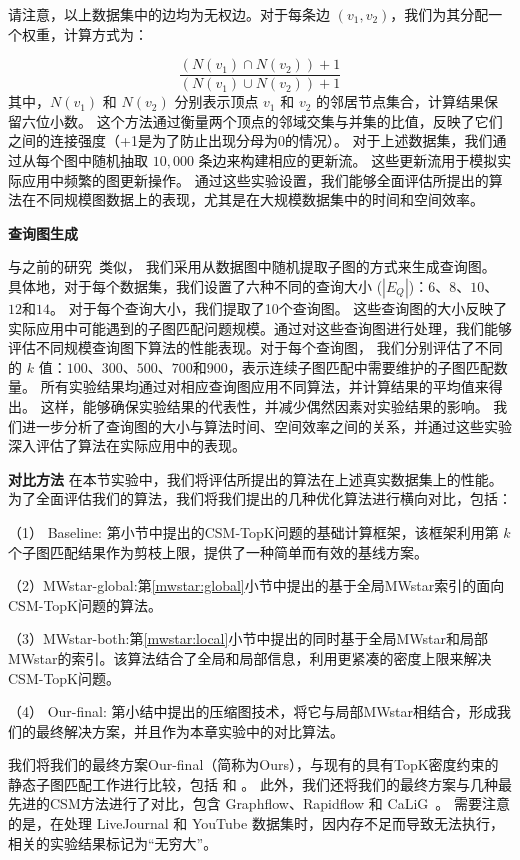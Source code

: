 请注意，以上数据集中的边均为无权边。对于每条边 $(v_1, v_2)$，我们为其分配一个权重，计算方式为：

\[
    \frac{(N(v_1) \cap N(v_2)) + 1}{(N(v_1) \cup N(v_2)) + 1}
\]
其中，$N(v_1)$ 和 $N(v_2)$ 分别表示顶点 $v_1$ 和 $v_2$ 的邻居节点集合，计算结果保留六位小数。
这个方法通过衡量两个顶点的邻域交集与并集的比值，反映了它们之间的连接强度（+1是为了防止出现分母为0的情况）。
对于上述数据集，我们通过从每个图中随机抽取 $10,000$ 条边来构建相应的更新流。
这些更新流用于模拟实际应用中频繁的图更新操作。
通过这些实验设置，我们能够全面评估所提出的算法在不同规模图数据上的表现，尤其是在大规模数据集中的时间和空间效率。


\textbf{查询图生成}
\label{ss-sec:querygen}

与之前的研究~\cite{csm-turboflux-DBLP:conf/sigmod/KimSHLHCSJ18,csm-symbi-DBLP:journals/pvldb/MinPPGIH21,csm-survey:DBLP:journals/pvldb/SunSLH22}类似，
我们采用从数据图中随机提取子图的方式来生成查询图。
具体地，对于每个数据集，我们设置了六种不同的查询大小 ($|E_Q|$)：$6$、$8$、$10$、$12$和$14$。
对于每个查询大小，我们提取了10个查询图。
这些查询图的大小反映了实际应用中可能遇到的子图匹配问题规模。通过对这些查询图进行处理，我们能够评估不同规模查询图下算法的性能表现。对于每个查询图，
我们分别评估了不同的 $k$ 值：$100$、$300$、$500$、$700$和$900$，表示连续子图匹配中需要维护的子图匹配数量。
所有实验结果均通过对相应查询图应用不同算法，并计算结果的平均值来得出。
这样，能够确保实验结果的代表性，并减少偶然因素对实验结果的影响。
我们进一步分析了查询图的大小与算法时间、空间效率之间的关系，并通过这些实验深入评估了算法在实际应用中的表现。

\textbf{对比方法}
在本节实验中，我们将评估所提出的算法在上述真实数据集上的性能。为了全面评估我们的算法，我们将我们提出的几种优化算法进行横向对比，包括：

（1） Baseline: 第\label{ch3:base-framework}小节中提出的CSM-TopK问题的基础计算框架，该框架利用第 $k$ 个子图匹配结果作为剪枝上限，提供了一种简单而有效的基线方案。

（2）MWstar-global:第\ref{mwstar:global}小节中提出的基于全局MWstar索引的面向CSM-TopK问题的算法。

（3）MWstar-both:第\ref{mwstar:local}小节中提出的同时基于全局MWstar和局部MWstar的索引。该算法结合了全局和局部信息，利用更紧凑的密度上限来解决CSM-TopK问题。

（4） Our-final: 第\label{mwstar:compact-graph}小结中提出的压缩图技术，将它与局部MWstar相结合，形成我们的最终解决方案，并且作为本章实验中的对比算法。


我们将我们的最终方案Our-final（简称为Ours），与现有的具有TopK密度约束的静态子图匹配工作进行比较，包括 \itk\cite{static-topk-Gupta-DBLP:conf/icde/GuptaGYCH14} 和 \pm\cite{static-topk-Chen-DBLP:journals/ijprai/ChenLCTL18}。
此外，我们还将我们的最终方案与几种最先进的CSM方法进行了对比，包含 Graphflow\cite{csm-graphflow-DBLP:conf/sigmod/KankanamgeSMCS17}、Rapidflow\cite{csm-rapidflow-DBLP:journals/pvldb/SunSHL22} 和 CaLiG~\cite{csm-calig-DBLP:journals/pacmmod/YangZZY23}。
需要注意的是，\itk 在处理 LiveJournal 和 YouTube 数据集时，因内存不足而导致无法执行，相关的实验结果标记为“无穷大”。

